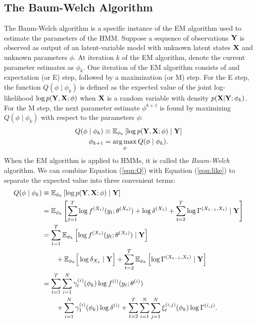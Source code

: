 \subsection{The Baum-Welch Algorithm}

The Baum-Welch algorithm is a specific instance of the EM algorithm used to estimate the parameters of the HMM. Suppose a sequence of observations $\mathbf{Y}$ is observed as output of an latent-variable model with unknown latent states $\mathbf{X}$ and unknown parameters $\phi$. At iteration $k$ of the EM algorithm, denote the current parameter estimates as $\phi_{k}$. One iteration of the EM algorithm consists of and expectation (or E) step, followed by a maximization (or M) step. For the E step, the function $Q(\phi \mid \phi_{k})$ is defined as the expected value of the joint log-likelihood $\log p(\mathbf{Y},\mathbf{X}; \phi)$ when $\mathbf{X}$ is a random variable with density $p(\mathbf{X} | \mathbf{Y} ; \phi_{k})$. For the M step, the next parameter estimate $\phi^{k+1}$ is found by maximizing $Q(\phi \mid \phi_{k})$ with respect to the parameters $\phi$:
%
\begin{gather}
    Q(\phi \mid \phi_{k}) \equiv \mathbb{E}_{\phi_{k}}\left[\log p(\mathbf{Y},\mathbf{X};\phi) \mid \mathbf{Y} \right] \label{eqn:Q} \\
    \phi_{k+1} = \operatorname*{arg\,max}_{\phi} Q(\phi \mid \phi_{k}). \label{eqn:BW_update}
\end{gather}
%
When the EM algorithm is applied to HMMs, it is called the \textit{Baum-Welch} algorithm. We can combine Equation (\ref{eqn:Q}) with Equation (\ref{eqn:like}) to separate the expected value into three convenient terms:
\begin{align}
    Q(\phi \mid \phi_{k}) &\equiv \mathbb{E}_{\phi_{k}}\left[\log p(\mathbf{Y},\mathbf{X};\phi) \mid \mathbf{Y} \right] \\
    &= \mathbb{E}_{\phi_{k}} \left[\sum_{t=1}^T \log f^{(X_t)}(y_t;\theta^{(X_t)}) + \log \delta^{(X_1)} + \sum_{t=2}^{T} \log \Gamma^{(X_{t-1},X_{t})} \mid \mathbf{Y} \right] \\
    &= \sum_{t = 1}^T \mathbb{E}_{\phi_{k}} \left[ \log f^{(X_t)}(y_t;\theta^{(X_t)}) \mid \mathbf{Y} \right]  \\
    & \qquad + \mathbb{E}_{\phi_{k}} \Big[\log \delta_{X_1} \mid \mathbf{Y} \Big] + \sum_{t=2}^{T} \mathbb{E}_{\phi_{k}} \left[ \log \Gamma^{(X_{t-1},X_{t})} \mid \mathbf{Y} \right] \\
    &= \sum_{t = 1}^T \sum_{i=1}^N \gamma^{(i)}_t(\phi_{k}) \log f^{(i)}(y_t;\theta^{(i)}) \\
    & \qquad + \sum_{i=1}^N \gamma^{(i)}_1(\phi_{k}) \log \delta^{(i)} + \sum_{t=2}^{T} \sum_{i=1}^N \sum_{j=1}^N \xi_t^{(i,j)}(\phi_{k}) \log \Gamma^{(i,j)}.
\end{align}

